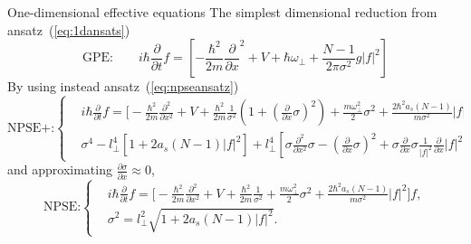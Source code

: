 \documentclass[final]{beamer}
\newlength{\colwidth}
\begin{document}
\begin{frame}[t]
\begin{columns}[t]
\begin{column}{\colwidth}
      \begin{block}{One-dimensional effective equations}
        The simplest dimensional reduction from ansatz~(\ref{eq:1dansats})
        \begin{equation}
          \text{GPE:} \qquad i\hbar \frac{\partial}{\partial t} f = \left[-\dfrac{\hbar^2}{2m} \frac{\partial}{\partial x}^2  + V + \hbar\omega_\perp+ \dfrac{N-1}{2\pi \sigma^2} g|f|^2 \right]
        \end{equation}
        By using instead ansatz~(\ref{eq:npseansatz})
        \begin{equation}
          \text{NPSE+:}\left\{\begin{split}
              &      i \hbar \frac{\partial}{\partial t} f = \bigg[- \frac{\hbar^2}{2 m} \frac{\partial^2}{\partial x^2} + V + \frac{\hbar^2}{2m} \frac{1}{\sigma^2}\left(1+ \left(\frac{\partial}{\partial x} \sigma\right)^2 \right) +\frac{m\omega_\perp^2}{2}\sigma^2 + \frac{2 \hbar^2 a_s (N-1)}{m \sigma^2}|f|^2 \bigg], \\
          &\sigma^4 - l_\perp^4\left[1 + 2a_s{ (N-1)}|f|^2\right]
          +l_\perp^4\left[\sigma \frac{\partial^2}{\partial x^2} \sigma -\left(\frac{\partial}{\partial x}\sigma\right)^2 +\sigma \frac{\partial}{\partial x}\sigma \frac{1}{|f|^2}\frac{\partial}{\partial x} |f|^2 \right] = 0.
        \end{split} \right.
        \end{equation}
        and approximating $\frac{\partial \sigma}{\partial x} \approx 0$, 
        \begin{equation}
          \text{NPSE:}\left\{\begin{split}
              & i \hbar \frac{\partial}{\partial t} f = \bigg[- \frac{\hbar^2}{2 m} \frac{\partial^2}{\partial x^2} + V +\frac{\hbar^2}{2m} \frac{1}{\sigma^2} + \frac{m\omega_\perp^2}{2}\sigma^2 + \frac{2 \hbar^2 a_s (N-1)}{m \sigma^2}|f|^2 \bigg]f, \\
          &\sigma^2 = l_\perp^2\sqrt{1+ 2a_s(N-1)|f|^2}.
        \end{split} \right.
        \end{equation} 


\end{block}
\end{column}
\end{columns}
\end{frame}
\end{document}
